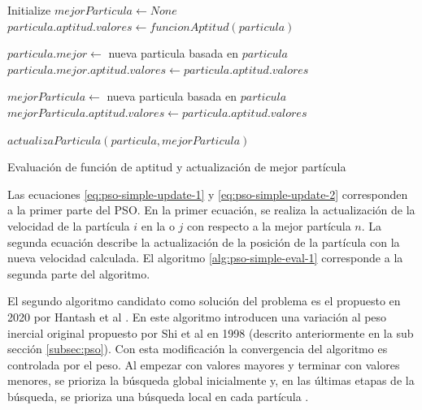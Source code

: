 \documentclass[letterpaper]{report}
\begin{document}
    \begin{algorithm}
      \begin{algorithmic}
        \State Initialize $mejorParticula \gets None$
            \State $particula.aptitud.valores \gets funcionAptitud(particula)$

              \State $particula.mejor \gets$ nueva particula basada en $particula$
              \State $particula.mejor.aptitud.valores \gets particula.aptitud.valores$
            \EndIf

              \State $mejorParticula \gets$ nueva particula basada en $particula$
              \State $mejorParticula.aptitud.valores \gets particula.aptitud.valores$
            \EndIf
          \EndFor 

            \State $actualizaParticula(particula, mejorParticula)$
          \EndFor
        \EndFor
        \caption{Evaluación de función de aptitud y actualización de mejor
          partícula}
        \label{alg:pso-simple-eval-1}
      \end{algorithmic}
    \end{algorithm}

    Las ecuaciones \ref{eq:pso-simple-update-1} y \ref{eq:pso-simple-update-2}
    corresponden a la primer parte del PSO. En la primer ecuación, se realiza la
    actualización de la velocidad de la partícula $i$ en la o $j$ con
    respecto a la mejor partícula $n$. La segunda ecuación describe la
    actualización de la posición de la partícula con la nueva velocidad
    calculada. El algoritmo \ref{alg:pso-simple-eval-1} corresponde a la segunda
    parte del algoritmo.

    El segundo algoritmo candidato como solución del problema es el propuesto
    en 2020 por Hantash et al \cite{PSOEnergy}. En este algoritmo introducen una
    variación al peso inercial original propuesto por Shi et al \cite{CPSO} en
    1998 (descrito anteriormente en la sub sección \ref{subsec:pso}). Con esta
    modificación la convergencia del algoritmo es controlada por el peso. Al 
    empezar con valores mayores y terminar con valores menores, se prioriza la
    búsqueda global inicialmente y, en las últimas etapas de la búsqueda, se
    prioriza una búsqueda local en cada partícula \cite{CPSO}.
\end{document}
